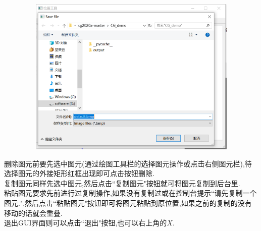 \documentclass[a4paper,UTF8]{article}
\theoremstyle{definition}
\begin{document}
\begin{figure}[H]
	\includegraphics[width=5in,height=3in]{save.png}
\end{figure}
删除图元前要先选中图元(通过绘图工具栏的选择图元操作或点击右侧图元栏),待选择图元的外接矩形红框出现即可点击按钮删除.\\
\indent 复制图元同样先选中图元,然后点击``复制图元"按钮就可将图元复制到后台里.\\
\indent 粘贴图元要求先前进行过复制操作,如果没有复制过或在控制台提示``请先复制一个图元.",然后点击``粘贴图元"按钮即可将图元粘贴到原位置,如果之前的复制的没有移动的话就会重叠.\\
\indent 退出GUI界面则可以点击``退出"按钮,也可以右上角的$X$.
\end{document}
